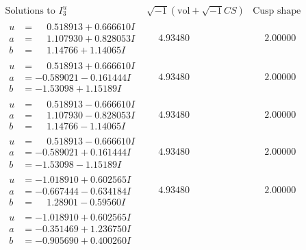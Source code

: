 \documentclass[1p]{elsarticle_modified}
\theoremstyle{definition}
\newcommand{\I}{\sqrt{-1}}
\begin{document}
$$\begin{array}{c|c|c}  
\text{Solutions to }I^u_{3}& \I (\text{vol} + \sqrt{-1}CS) & \text{Cusp shape}\\
 \hline 
\begin{aligned}
u &= \phantom{-}0.518913 + 0.666610 I \\
a &= \phantom{-}1.107930 + 0.828053 I \\
b &= \phantom{-}1.14766 + 1.14065 I\end{aligned}
 & \phantom{-}4.93480\phantom{ +0.000000I} & \phantom{-}2.00000\phantom{ +0.000000I} \\ \hline\begin{aligned}
u &= \phantom{-}0.518913 + 0.666610 I \\
a &= -0.589021 - 0.161444 I \\
b &= -1.53098 + 1.15189 I\end{aligned}
 & \phantom{-}4.93480\phantom{ +0.000000I} & \phantom{-}2.00000\phantom{ +0.000000I} \\ \hline\begin{aligned}
u &= \phantom{-}0.518913 - 0.666610 I \\
a &= \phantom{-}1.107930 - 0.828053 I \\
b &= \phantom{-}1.14766 - 1.14065 I\end{aligned}
 & \phantom{-}4.93480\phantom{ +0.000000I} & \phantom{-}2.00000\phantom{ +0.000000I} \\ \hline\begin{aligned}
u &= \phantom{-}0.518913 - 0.666610 I \\
a &= -0.589021 + 0.161444 I \\
b &= -1.53098 - 1.15189 I\end{aligned}
 & \phantom{-}4.93480\phantom{ +0.000000I} & \phantom{-}2.00000\phantom{ +0.000000I} \\ \hline\begin{aligned}
u &= -1.018910 + 0.602565 I \\
a &= -0.667444 - 0.634184 I \\
b &= \phantom{-}1.28901 - 0.59560 I\end{aligned}
 & \phantom{-}4.93480\phantom{ +0.000000I} & \phantom{-}2.00000\phantom{ +0.000000I} \\ \hline\begin{aligned}
u &= -1.018910 + 0.602565 I \\
a &= -0.351469 + 1.236750 I \\
b &= -0.905690 + 0.400260 I\end{aligned}

\end{array}$$
\end{document}
